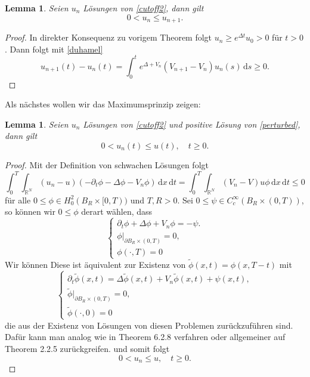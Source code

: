 \documentclass[11pt,twoside,a4paper]{article}
\newtheorem{lem}[thm]{Lemma}
\theoremstyle{break}
\begin{document}
\begin{lem} Seien $u_n$ Lösungen von \eqref{cutoff2}, dann gilt
\begin{equation}
0 <u_n \le u_{n+1}.
\end{equation}
\end{lem}
\begin{proof}
In direkter Konsequenz zu vorigem Theorem folgt $u_n\ge e^{\Delta t} u_0> 0$ für $t>0$. Dann folgt mit \eqref{duhamel} 
\begin{equation}
u_{n+1}(t) -u_n(t)= \int_0^t e^{\Delta + V_n} (V_{n+1}-V_n) u_{n}(s)\, \mathrm ds\ge 0.
\end{equation}
\end{proof}

Als nächstes wollen wir das Maximumsprinzip zeigen:
\begin{lem} Seien $u_n$ Lösungen von \eqref{cutoff2} und positive Lösung von \eqref{perturbed}, dann gilt
\begin{equation}
0<u_n(t)\le u(t), \quad t\ge 0.
\end{equation}
\end{lem}
\begin{proof}
Mit der Definition von schwachen Lösungen folgt
\begin{equation}
\int_0^T \int_{\mathbb R^N} (u_n-u) (-\partial_t \phi - \Delta \phi - V_n \phi) \, \mathrm dx \, \mathrm dt = \int_0^T \int_{\mathbb R^N} (V_n -V) u\phi \, \mathrm dx \, \mathrm dt \le 0
\end{equation} 
für alle $0\le \phi \in H_0^2(B_R \times [0, T))$ und $T,R>0$.  Sei $0 \le \psi \in C_c^\infty(B_R\times (0,T))$, so können wir $0 \le  \phi$ derart wählen, dass 
\begin{equation}
\begin{cases}
\partial_t \phi + \Delta \phi + V_n \phi = - \psi.\\
\phi\big|_{\partial B_R \times (0,T)} =0,\\
\phi(\cdot ,T)=0
\end{cases}
\end{equation}
Wir können 
Diese ist äquivalent zur Existenz von $\tilde \phi(x,t)=\phi(x,T-t)$ mit
\begin{equation}
\begin{cases}
\partial_t \tilde \phi(x,t) = \Delta \tilde \phi(x,t)+V_n \tilde \phi(x,t)+\psi(x,t),\\
\tilde \phi\big|_{\partial B_R \times (0,T)} =0,\\
\tilde \phi(\cdot,0)=0
\end{cases}
\end{equation}
die aus der Existenz von Lösungen von diesen Problemen zurückzuführen sind. Dafür kann man analog wie in \cite{arendt} Theorem 6.2.8 verfahren oder allgemeiner auf \cite{lady} Theorem 2.2.5 zurückgreifen.
und somit folgt 
\begin{equation}
0<u_n \le u, \quad t\ge 0.
\end{equation}
\end{proof}
\end{document}

